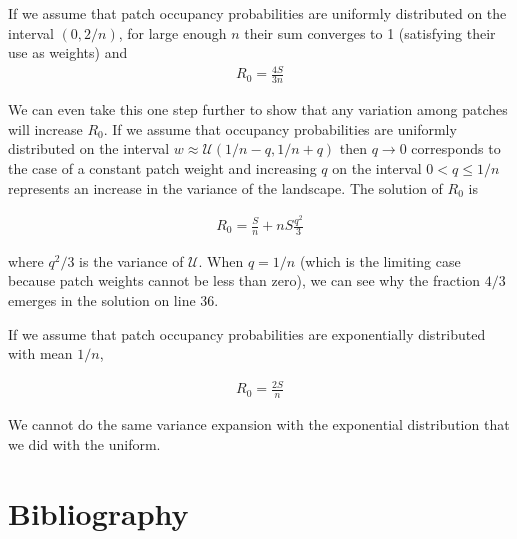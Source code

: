 If we assume that patch occupancy probabilities are uniformly distributed on the interval $(0,2/n)$, for large enough $n$ their sum converges to 1 (satisfying their use as weights) and 
\begin{align}
R_0=\frac{4S}{3n}
\end{align}

We can even take this one step further to show that any variation among patches will increase $R_0$. If we assume that occupancy probabilities are uniformly distributed on the interval $w \approx  \mathcal{U}(1/n-q,1/n+q)$ then $q\rightarrow0$ corresponds to the case of a constant patch weight and increasing $q$ on the interval $0<q\leq 1/n$ represents an increase in the variance of the landscape.  The solution of $R_0$ is

\begin{align}
R_0=\frac{S}{n}+n S \frac{q^2}{3}
\end{align}

where $q^2/3$ is the variance of $\mathcal{U}$.  When $q=1/n$ (which is the limiting case because patch weights cannot be less than zero), we can see why the fraction $4/3$ emerges in the solution on line 36. 

If we assume that patch occupancy probabilities are exponentially distributed with mean $1/n$,

\begin{align}
R_0=\frac{2S}{n}
\end{align}

We cannot do the same variance expansion with the exponential distribution that we did with the uniform.   




\section*{Bibliography}



